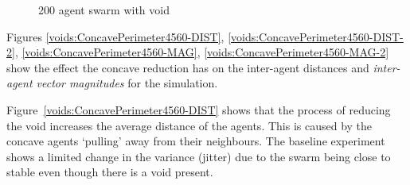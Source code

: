\begin{figure}[H]
\centering
\caption[200 agent swarm with void]{200 agent swarm with void}
\label{fig:VoidConcaveReduction}
\end{figure}

Figures \ref{voids:ConcavePerimeter4560-DIST}, \ref{voids:ConcavePerimeter4560-DIST-2}, \ref{voids:ConcavePerimeter4560-MAG}, \ref{voids:ConcavePerimeter4560-MAG-2} show the effect the concave reduction has on the inter-agent distances and \textit{inter-agent vector magnitudes} for the simulation. 

Figure~\ref{voids:ConcavePerimeter4560-DIST} shows that the process of reducing the void increases the average distance of the agents. This is caused by the concave agents `pulling' away from their neighbours. The baseline experiment shows a limited change in the variance (jitter) due to the swarm being close to stable even though there is a void present. 

